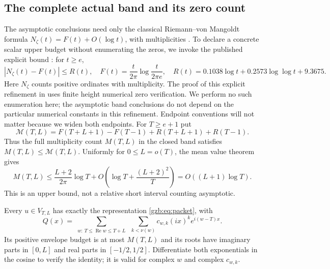 \documentclass[11pt,a4paper]{article}
\numberwithin{equation}{section}
\theoremstyle{definition}\newtheorem{definition}[theorem]{Definition}
\theoremstyle{remark}\newtheorem{remark}[theorem]{Remark}
\DeclareMathOperator{\Rea}{Re}\DeclareMathOperator{\Ima}{Im}
\begin{document}
\subsection{The complete actual band and its zero count}
The asymptotic conclusions need only the classical Riemann--von Mangoldt
formula $N_\zeta(t)=F(t)+O(\log t)$, with multiplicities
\cite{vonMangoldt,HSW}. To declare a concrete scalar upper budget without
enumerating the zeros, we invoke the published explicit bound
\cite[Corollary 1.2]{HSW}: for $t\ge e$,
\begin{equation}\label{gzb:eq:count}
 |N_\zeta(t)-F(t)|\le R(t),\quad
 F(t)=\frac{t}{2\pi}\log\frac{t}{2\pi e},\quad
 R(t)=0.1038\log t+0.2573\log\log t+9.3675.
\end{equation}
Here $N_\zeta$ counts positive ordinates with multiplicity. The proof of
this explicit refinement in \cite{HSW} uses finite height numerical zero
verification. We perform no such enumeration here; the asymptotic band
conclusions do not depend on the particular numerical constants in this
refinement. Endpoint conventions will not matter because we widen both endpoints.
For $T\ge e+1$ put
\begin{equation}\label{gzb:eq:countbudget}
 \mathcal M(T,L)=F(T+L+1)-F(T-1)+R(T+L+1)+R(T-1).
\end{equation}
Thus the full multiplicity count $M(T,L)$ in the closed band satisfies
$M(T,L)\le\mathcal M(T,L)$.
Uniformly for $0\le L=o(T)$, the mean value theorem gives
\begin{equation}\label{gzb:eq:count-asym}
 M(T,L)\le\frac{L+2}{2\pi}\log T+
       O\left(\log T+\frac{(L+2)^2}{T}\right)
       =O((L+1)\log T).
\end{equation}
This is an upper bound, not a relative short interval counting asymptotic.

Every $u\in V_{T,L}$ has exactly the representation \eqref{gzb:eq:packet}, with
\begin{equation}\label{gzb:eq:actual-envelope}
 Q(x)=\sum_{\substack{w:\ T\le\Rea w\le T+L}}
       \ \sum_{k<\nu(w)}c_{w,k}(ix)^k e^{i(w-T)x}.
\end{equation}
Its positive envelope budget is at most $M(T,L)$ and its roots have
imaginary parts in $[0,L]$ and real parts in $[-1/2,1/2]$.
Differentiate both exponentials in the cosine to verify the identity;
it is valid for complex $w$ and complex $c_{w,k}$.
\end{document}
